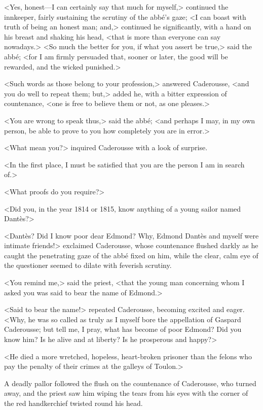 <Yes, honest—I can certainly say that much for myself,> continued the innkeeper, fairly sustaining the scrutiny of the abbé's gaze; <I can boast with truth of being an honest man; and,> continued he significantly, with a hand on his breast and shaking his head, <that is more than everyone can say nowadays.>  <So much the better for you, if what you assert be true,> said the abbé; <for I am firmly persuaded that, sooner or later, the good will be rewarded, and the wicked punished.> 

 <Such words as those belong to your profession,> answered Caderousse, <and you do well to repeat them; but,> added he, with a bitter expression of countenance, <one is free to believe them or not, as one pleases.> 

 <You are wrong to speak thus,> said the abbé; <and perhaps I may, in my own person, be able to prove to you how completely you are in error.> 

 <What mean you?> inquired Caderousse with a look of surprise. 

 <In the first place, I must be satisfied that you are the person I am in search of.> 

 <What proofs do you require?> 

 <Did you, in the year 1814 or 1815, know anything of a young sailor named Dantès?> 

 <Dantès? Did I know poor dear Edmond? Why, Edmond Dantès and myself were intimate friends!> exclaimed Caderousse, whose countenance flushed darkly as he caught the penetrating gaze of the abbé fixed on him, while the clear, calm eye of the questioner seemed to dilate with feverish scrutiny. 

 <You remind me,> said the priest, <that the young man concerning whom I asked you was said to bear the name of Edmond.> 

 <Said to bear the name!> repeated Caderousse, becoming excited and eager. <Why, he was so called as truly as I myself bore the appellation of Gaspard Caderousse; but tell me, I pray, what has become of poor Edmond? Did you know him? Is he alive and at liberty? Is he prosperous and happy?> 

 <He died a more wretched, hopeless, heart-broken prisoner than the felons who pay the penalty of their crimes at the galleys of Toulon.> 

 A deadly pallor followed the flush on the countenance of Caderousse, who turned away, and the priest saw him wiping the tears from his eyes with the corner of the red handkerchief twisted round his head. 

